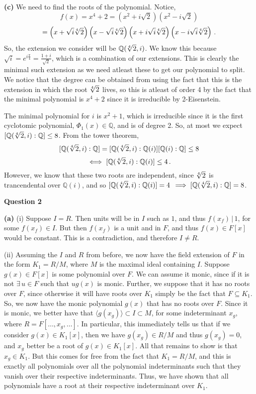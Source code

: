 \documentclass[10pt]{article}
\newcommand{\Q}{\mathbb{Q}}
\begin{document}
\textbf{(c)} We need to find the roots of the polynomial. Notice,
\[ f(x) = x^{4} + 2 = (x^{2} + i\sqrt{2})(x^{2} - i\sqrt{2})\]
\[ = \left(x + \sqrt{i}\sqrt[\leftroot{1}\uproot{0}4]{2}\right)\left(x - \sqrt{i}\sqrt[\leftroot{1}\uproot{0}4]{2}\right)\left(x + i\sqrt{i}\sqrt[\leftroot{1}\uproot{0}4]{2}\right)\left(x - i\sqrt{i}\sqrt[\leftroot{1}\uproot{0}4]{2}\right) \, .\]
So, the extension we consider will be $\Q(\sqrt[\leftroot{1}\uproot{0}4]{2},i)$. We know this because $\sqrt{i} = e^{i\frac{\pi}{4}} = \frac{1 + i}{\sqrt{2}}$, which is a combination of our extensions. This is clearly the minimal such extension as we need atleast these to get our polynomial to split. We notice that the degree can be obtained from using the fact that this is the extension in which the root $\sqrt[\leftroot{1}\uproot{0}4]{2}$ lives, so this is atleast of order 4 by the fact that the minimal polynomial is $x^{4} + 2$ since it is irreducible by 2-Eisenstein.

The minimal polynomial for $i$ is $x^{2} + 1$, which is irreducible since it is the first cyclotomic polynomial, $\Phi_{1}(x) \in \Q$, and is of degree 2. So, at most we expect $[\Q(\sqrt[\leftroot{1}\uproot{0}4]{2},i):\Q] \leq 8$. From the tower theorem,
\[ [\Q(\sqrt[\leftroot{1}\uproot{0}4]{2},i):\Q] = [\Q(\sqrt[\leftroot{1}\uproot{0}4]{2},i):\Q(i)][\Q(i):\Q] \leq 8\]
\[ \iff [\Q(\sqrt[\leftroot{1}\uproot{0}4]{2},i):\Q(i)] \leq 4 \, .\]
However, we know that these two roots are independent, since $\sqrt[\leftroot{1}\uproot{0}4]{2}$ is trancendental over $\Q(i)$, and so $[\Q(\sqrt[\leftroot{1}\uproot{0}4]{2},i):\Q(i)] = 4$ $\implies [\Q(\sqrt[\leftroot{1}\uproot{0}4]{2},i):\Q] = 8$. 

\newpage
\textbf{Question 2}

\textbf{(a)} (i) Suppose $I=R$. Then units will be in $I$ such as $1$, and thus $f(x_{f})\, | \, 1$, for some $f(x_{f})\in I$. But then $f(x_{f})$ is a unit and in $F$, and thus $f(x)\in F[x]$ would be constant. This is a contradiction, and therefore $I\neq R$.

(ii) Assuming the $I$ and $R$ from before, we now have the field extension of $F$ in the form $K_{1} = R/M$, where $M$ is the maximal ideal containing $I$. Suppose $g(x) \in F[x]$ is some polynomial over $F$. We can assume it monic, since if it is not $\exists\, u \in F$ such that $ug(x)$ is monic. Further, we suppose that it has no roots over $F$, since otherwise it will have roots over $K_{1}$ simply be the fact that $F \subseteq K_{1}$. So, we now have the monic polynomial $g(x)$ that has no roots over $F$. Since it is monic, we better have that $\langle g(x_{g})\rangle \subset I\subset M$, for some indeterminant $x_{g}$, where $R = F[\dots, x_{g},\dots]$. In particular, this immediately tells us that if we consider $g(x)\in K_{1}[x]$, then we have $g(x_{g})\in R/M$ and thus $g(x_{g}) = 0$, and $x_{g}$ better be a root of $g(x)\in K_{1}[x]$. All that remains to show is that $x_{g}\in K_{1}$. But this comes for free from the fact that $K_{1} = R/M$, and this is exactly all polynomials over all the polynomial indeterminants such that they vanish over their respective indeterminants. Thus, we have shown that all polynomials have a root at their respective indeterminant over $K_{1}$.
\end{document}

